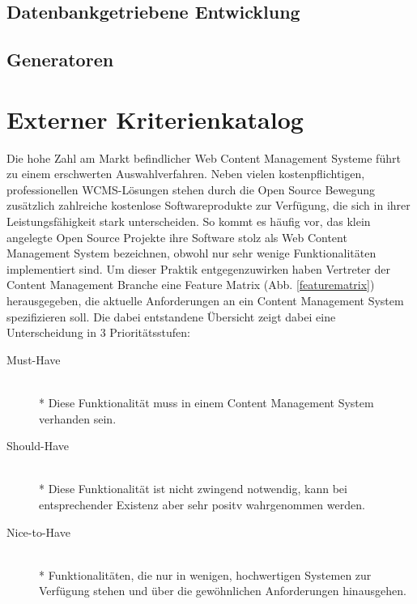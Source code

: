 \subsection{Datenbankgetriebene Entwicklung}
\subsection{Generatoren}

\newpage

\section{Externer Kriterienkatalog}
Die hohe Zahl am Markt befindlicher Web Content Management Systeme führt zu einem erschwerten Auswahlverfahren. Neben vielen kostenpflichtigen, professionellen WCMS-Lösungen stehen durch die Open Source Bewegung zusätzlich zahlreiche kostenlose Softwareprodukte zur Verfügung, die sich in ihrer Leistungsfähigkeit stark unterscheiden.
So kommt es häufig vor, das klein angelegte Open Source Projekte ihre Software stolz als Web Content Management System bezeichnen, obwohl nur sehr wenige Funktionalitäten implementiert sind.
Um dieser Praktik entgegenzuwirken haben Vertreter der Content Management Branche eine Feature Matrix (Abb. \ref{featurematrix}) herausgegeben, die aktuelle Anforderungen an ein Content Management System spezifizieren soll. Die dabei entstandene Übersicht zeigt dabei eine Unterscheidung in 3 Prioritätsstufen:

\begin{description}
\item[Must-Have]\mbox{~}\\*
Diese Funktionalität muss in einem Content Management System verhanden sein.
\item[Should-Have]\mbox{~}\\*
Diese Funktionalität ist nicht zwingend notwendig, kann bei entsprechender Existenz aber sehr positv wahrgenommen werden.
\item[Nice-to-Have]\mbox{~}\\*
Funktionalitäten, die nur in wenigen, hochwertigen Systemen zur Verfügung stehen und über die gewöhnlichen Anforderungen hinausgehen.
\end{description}


